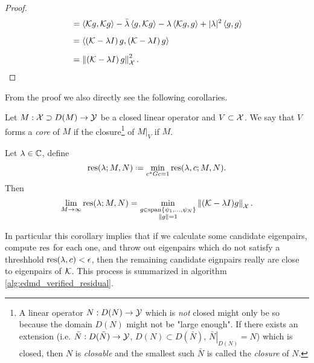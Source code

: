 \begin{proof}
\begin{equation}
\begin{split}
            &= \left\langle \mathcal{K} g, \mathcal{K} g \right\rangle
            - \bar{\lambda} \left\langle g, \mathcal{K} g \right\rangle
            - \lambda \left\langle \mathcal{K} g, g \right\rangle
            + | \lambda |^2 \left\langle g, g \right\rangle \\[1.2ex]
            &= \left\langle \left( \mathcal{K} - \lambda I \right) g, 
            \left( \mathcal{K} - \lambda I \right) g \right\rangle \\[1.2ex]
            &= \left\| \left( \mathcal{K} - \lambda I \right) g \right\|_{\mathcal{X}}^2 . 
        \end{split}
    \end{equation}
\end{proof}

From the proof we also directly see the following corollaries. 

\begin{definition}
    Let $M : \mathcal{X} \supset D(M) \to \mathcal{Y}$ be a closed linear operator and 
    $V \subset \mathcal{X}$. We say that $V$ forms a \emph{core} of $M$ if the closure\footnote{
        A linear operator $N : D(N) \to \mathcal{Y}$ which is \emph{not} closed might only be so 
        because the domain $D(N)$ might not be "large enough". If there exists an extension 
        (i.e. $\bar{N} : D(\bar{N}) \to \mathcal{Y}$, $D(N) \subset D(\bar{N})$, 
        $\left. \bar{N} \right|_{D(N)} = N$) which is closed, then $N$ is \emph{closable} and 
        the smallest such $\bar{N}$ is called the \emph{closure} of $N$. 
    } 
    of $\left. M \right|_{V}$ if $M$. 
\end{definition}

\begin{corollary}
    Let $\lambda \in \mathbb{C}$, define
    \begin{equation}
        \res (\lambda; M, N)
        \defeq \min_{c^* G c = 1} \res (\lambda, c; M, N) . 
    \end{equation} 
    Then
    \begin{equation}
        \label{eq:resdmd_M_limit}
        \lim_{M \to \infty} \text{res} (\lambda; M, N)
        = \min_{\substack{g \in \text{span} \left\{ \psi_1, \ldots, \psi_N \right\} \\ \| g \| = 1}}
            \left\| ( \mathcal{K} - \lambda I ) g \right\|_{\mathcal{X}} . 
    \end{equation}
\end{corollary}

In particular this corollary implies that if we calculate some candidate eigenpairs, 
compute $\text{res}$ for each one, and throw out eigenpairs which do not satisfy 
a threshhold $\text{res} (\lambda, c) < \epsilon$, then the remaining candidate 
eignpairs really are close to eigenpairs of $\mathcal{K}$. This process is summarized in 
algorithm \ref{alg:edmd_verified_residual}. 

